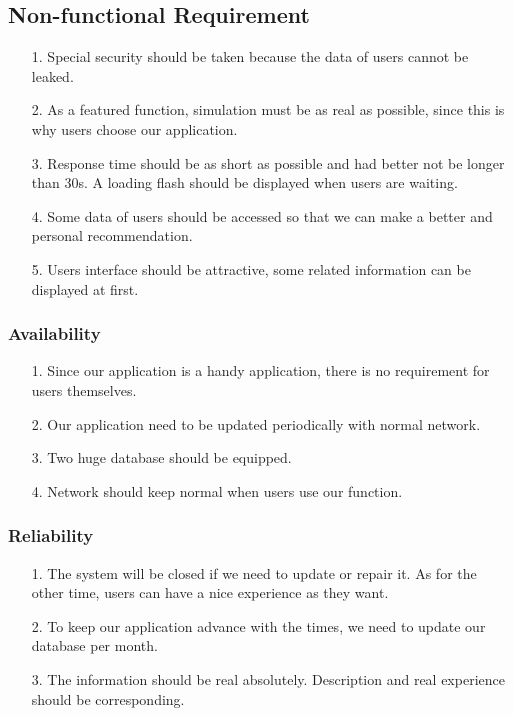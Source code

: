 \documentclass[10pt]{article}
\begin{document}
\subsection{Non-functional Requirement}
\begin{itemize}
	\item[1.]Special security should be taken because the data of users cannot be leaked.
	\item[2.] As a featured function, simulation must be as real as possible, since this is why users choose our application.
	\item[3.]  Response time should be as short as possible and had better not be longer than 30s. A loading flash should be displayed when users are waiting.
	\item[4.] Some data of users should be accessed so that we can make a better and personal recommendation.
	\item[5.]Users interface should be attractive, some related information can be displayed at first.
\end{itemize}

\subsubsection{Availability}
\begin{itemize}
	\item[1.] Since our application is a handy application, there is no requirement for users themselves.
	\item[2.] Our application need to be updated periodically with normal network.
	\item[3.] Two huge database should be equipped.
	\item[4.] Network should keep normal when users use our function.
\end{itemize}

\subsubsection{Reliability}
\begin{itemize}
	\item[1.] The system will be closed if we need to update or repair it. As for the other time, users can have a nice experience as they want. 
	\item[2.]To keep our application advance with the times, we need to update our database per month. 
	\item[3.] The information should be real absolutely. Description and real experience should be corresponding. 
\end{itemize}
\end{document}
